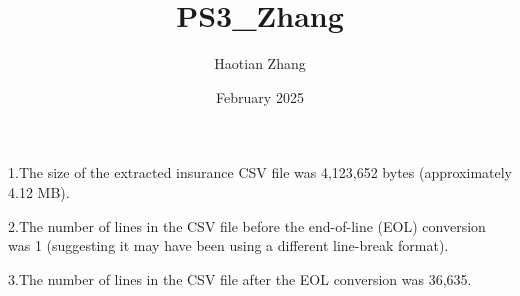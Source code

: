 \documentclass{article}
\title{PS3_Zhang}
\author{Haotian Zhang}
\date{February 2025}
\begin{document}
 

\maketitle 

1.The size of the extracted insurance CSV file was 4,123,652 bytes (approximately 4.12 MB). 

2.The number of lines in the CSV file before the end-of-line (EOL) conversion was 1 (suggesting it may have been using a different line-break format). 

3.The number of lines in the CSV file after the EOL conversion was 36,635. ​ 
\end{document}
